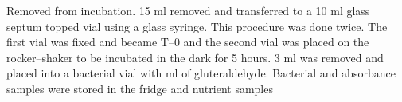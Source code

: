 Removed from incubation. 15 ml removed and transferred to a 10 ml glass septum topped vial using a glass syringe. This procedure was done twice. The first vial was fixed and became T--0 and the second vial was placed on the rocker--shaker to be incubated in the dark for 5 hours. 3 ml was removed and placed into a bacterial vial with ml of gluteraldehyde. Bacterial and absorbance samples were stored in the fridge and nutrient samples  